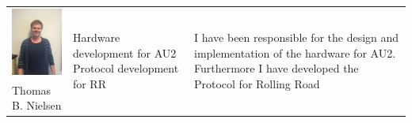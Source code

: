 \begin{tabular}[c]{|p{3cm}| p{5cm} | p{6cm}|}
	\phantom{Test}                                                                                                                                                                                                                                                      
	\includegraphics[width=3cm]{Introduction/TeamPictures/ThomasN} & \multirow{2}{5cm}{Hardware development for AU2 \newline \newline Protocol development for RR} & \multirow{2}{6cm}{I have been responsible for the design and implementation of the hardware for AU2. Furthermore I have developed the Protocol for Rolling Road} \\
	Thomas B. \newline Nielsen & & \\ \hline
\end{tabular}